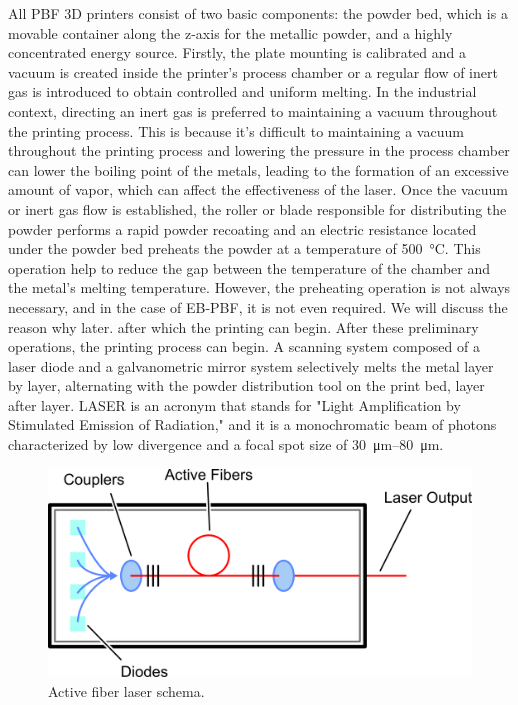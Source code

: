 All PBF 3D printers consist of two basic components: the powder bed, which is a movable container along the z-axis for the metallic powder, and a highly concentrated energy source. 
Firstly, the plate mounting is calibrated and a vacuum is created inside the printer's process chamber or a regular flow of inert gas is introduced to obtain controlled and uniform melting. In the industrial context, directing an inert gas is preferred to maintaining a vacuum throughout the printing process. This is because it's difficult to maintaining a vacuum throughout the printing process and lowering the pressure in the process chamber can lower the boiling point of the metals, leading to the formation of an excessive amount of vapor, which can affect the effectiveness of the laser. Once the vacuum or inert gas flow is established, the roller or blade responsible for distributing the powder performs a rapid powder recoating and an electric resistance located under the powder bed preheats the powder at a temperature of \SI{500}{\degreeCelsius}. This operation help to reduce the gap between the temperature of the chamber and the metal's melting temperature. However, the preheating operation is not always necessary, and in the case of EB-PBF, it is not even required. We will discuss the reason why later. after which the printing can begin. After these preliminary operations, the printing process can begin. A scanning system composed of a laser diode and a galvanometric mirror system selectively melts the metal layer by layer, alternating with the powder distribution tool on the print bed, layer after layer. LASER is an acronym that stands for "Light Amplification by Stimulated Emission of Radiation," and it is a monochromatic beam of photons characterized by low divergence and a focal spot size of \SIrange[range-phrase = --]{30}{80}{\micro\metre}.
\begin{figure}[H]
    \centering
    \includegraphics[scale=0.5]{Images/laser2.png}
    \caption[Laser schema.]{Active fiber laser schema.}
    \label{fig:laser}
\end{figure}
